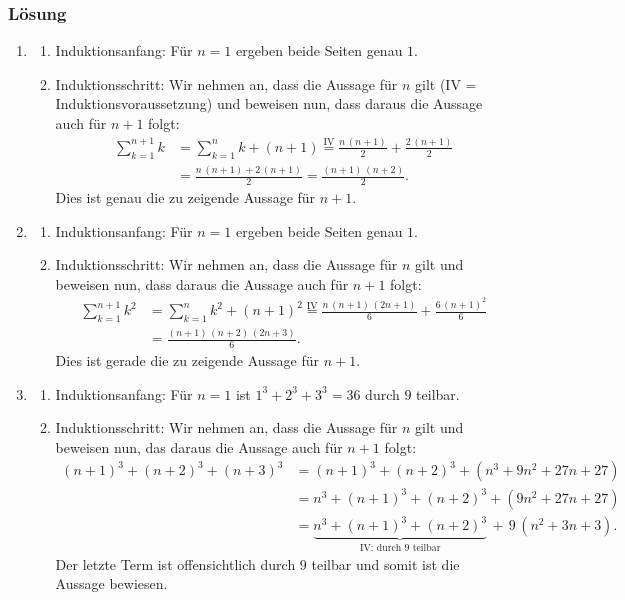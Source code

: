 \documentclass[a4paper,10pt]{article}
\newcommand{\s}[1]{#1}
\begin{document}
\s{\subsubsection*{Lösung}
	\begin{enumerate}[label=(\alph*)]
		\item 
		\begin{enumerate}[label=(\roman*)]
		    \item Induktionsanfang: Für $n=1$ ergeben beide Seiten genau $1$.
		    \item Induktionsschritt: Wir nehmen an, dass die Aussage für $n$ gilt (IV = Induktionsvoraussetzung) und beweisen nun, dass daraus die Aussage auch für $n+1$ folgt: \begin{align*}
		        \sum\limits_{k=1}^{n+1} k &= \sum\limits_{k=1}^{n} k + (n+1) \overset{\text{IV}}{=} \frac{n\, (n+1)}{2} + \frac{2 \, (n+1)}{2} \\
		        &= \frac{n\, (n+1) + 2 \, (n+1)}{2} = \frac{(n+1) \, (n+2)}{2}.
		    \end{align*}
		    Dies ist genau die zu zeigende Aussage für $n +1$.
		\end{enumerate}
		\item 
		\begin{enumerate}[label=(\roman*)]
		    \item Induktionsanfang: Für $n=1$ ergeben beide Seiten genau $1$.
		    \item Induktionsschritt: Wir nehmen an, dass die Aussage für $n$ gilt und beweisen nun, dass daraus die Aussage auch für $n+1$ folgt: 
		    \begin{align*}
		        \sum\limits_{k=1}^{n+1} k^2 &= \sum\limits_{k=1}^{n} k^2 + (n+1)^2 \overset{\text{IV}}{=} \frac{n\, (n+1)\,(2n+1)}{6} + \frac{6 \, (n+1)^2}{6} \\
		        &= \frac{(n+1)\, (n+2)\,(2n+3)}{6}.
		    \end{align*}
		    Dies ist gerade die zu zeigende Aussage für $n +1$.
		\end{enumerate}
		\item 
		\begin{enumerate}[label=(\roman*)]
		    \item Induktionsanfang: Für $n=1$ ist $1^3+2^3+3^3 = 36$ durch $9$ teilbar.
		    \item Induktionsschritt: Wir nehmen an, dass die Aussage für $n$ gilt und beweisen nun, das daraus die Aussage auch für $n+1$ folgt: 
		    \begin{align*}
		        (n+1)^3+(n+2)^3+(n+3)^3 &= (n+1)^3+(n+2)^3+(n^3+9n^2+27n+27)\\
		        &=n^3+(n+1)^3+(n+2)^3 + (9n^2+27n+27)\\
		        &=\underbrace{n^3+(n+1)^3+(n+2)^3}_{\text{IV: durch 9 teilbar}} \,+\, 9\,(n^2+3n+3).
		    \end{align*}
		    Der letzte Term ist offensichtlich durch $9$ teilbar und somit ist die Aussage bewiesen.
		\end{enumerate}
	\end{enumerate}
}
\end{document}
